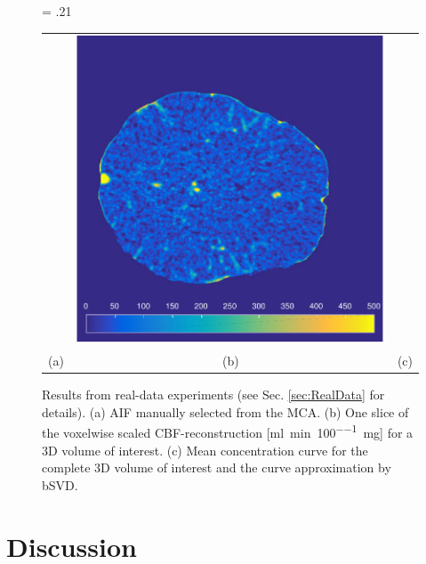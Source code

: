 \documentclass[final,5p,times,twocolumn]{elsarticle}
\begin{document}
	\begin{figure}[]
		\fwd = .21\textwidth
		\centering
		\begin{tabular}{ccc}
		 {\small} & \includegraphics[width = \fwd]{./figs/real_axial160.pdf} & {\small} \\
		 (a) & (b) & (c) 
		\end{tabular}
		\caption{Results from real-data experiments (see Sec. \ref{sec:RealData} for details). (a) AIF manually selected from the MCA. (b) One slice of the voxelwise scaled CBF-reconstruction [\si{\milli\litre\per\minute\per100\milli\gram}] for a 3D volume of interest. (c) Mean concentration curve for the complete 3D volume of interest and the curve approximation by bSVD.}\label{fig:RealData}
	\end{figure}


	
	
	\section{Discussion}\label{sec:conclusion}
\end{document}
